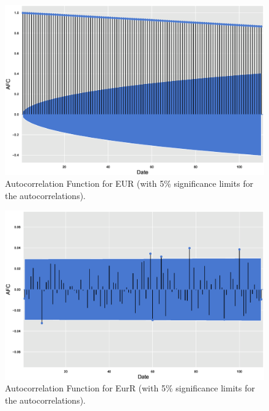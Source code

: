 	\begin{figure}[!ht]
	\centering
	\includegraphics[width=\textwidth]{chapters/chapter_mvts/figures/pautofun.eps}
	\caption{Autocorrelation Function for EUR (with 5\% significance limits for the autocorrelations). \label{fig:pautofun}}
	\end{figure}

	\begin{figure}[!ht]
	\centering
	\includegraphics[width=\textwidth]{chapters/chapter_mvts/figures/pautofun2.eps}
	\caption{Autocorrelation Function for EurR (with 5\% significance limits for the autocorrelations). \label{fig:pautofun2}}
	\end{figure}


